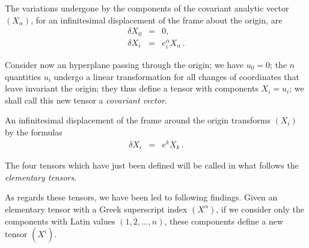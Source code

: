 The variations undergone by the components of the covariant analytic vector $(X_\alpha)$, for an infinitesimal displacement of the frame about the origin, are 
\begin{eqnarray*}
\delta X_0 &=& 0, \\
\delta X_i &=& e^\alpha_i X_\alpha\, .
\end{eqnarray*}

Consider now an hyperplane passing through the origin; we have $u_0=0$; the $n$ quantities $u_i$ undergo a linear transformation for all changes of coordinates that leave invariant the origin; they thus define a tensor with components $X_i = u_i$; we shall call this new tensor a {\em covariant vector}. 

An infinitesimal displacement of the frame around the origin transforms $(X_i)$ by the formulas
\begin{eqnarray*}
\delta X_i &=& e^k X_k\, .
\end{eqnarray*}

The four tensors which have just been defined will be called in what follows the {\em elementary tensors}. 

As regards these tensors, we have been led to following findings. Given an elementary tensor with a Greek superscript index $(X^\alpha)$, if we consider only the components with Latin values $(1, 2, ..., n)$, these components define a new tensor $(X^i)$.

